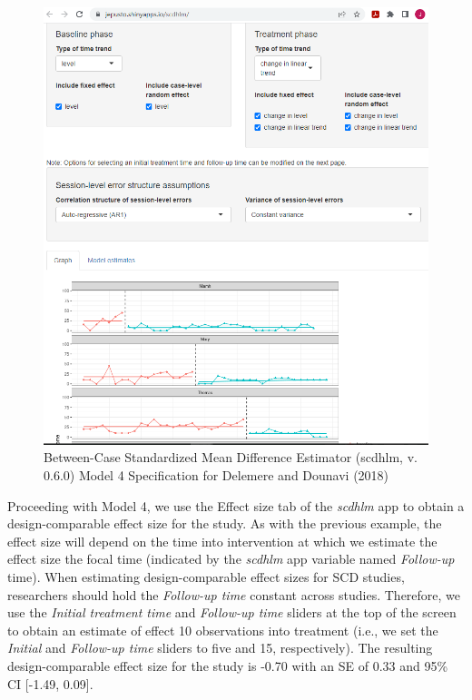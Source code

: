 \documentclass[
]{book}
\begin{document}
\begin{figure}
\includegraphics[width=0.6\linewidth]{images/app.model.model4_DelemereDounavi2018} \caption{Between-Case Standardized Mean Difference Estimator (scdhlm, v. 0.6.0) Model 4 Specification for Delemere and Dounavi (2018)}\label{fig:Delemere-model4}
\end{figure}

Proceeding with Model 4, we use the Effect size tab of the \emph{scdhlm} app to obtain a design-comparable effect size for the \citet{delemere2018ParentImplemented} study. As with the previous example, the effect size will depend on the time into intervention at which we estimate the effect size the focal time (indicated by the \emph{scdhlm} app variable named \emph{Follow-up} time). When estimating design-comparable effect sizes for SCD studies, researchers should hold the \emph{Follow-up time} constant across studies. Therefore, we use the \emph{Initial treatment time} and \emph{Follow-up time} sliders at the top of the screen to obtain an estimate of effect 10 observations into treatment (i.e., we set the \emph{Initial} and \emph{Follow-up time} sliders to five and 15, respectively). The resulting design-comparable effect size for the \citet{delemere2018ParentImplemented} study is -0.70 with an SE of 0.33 and 95\% CI {[}-1.49, 0.09{]}.
\end{document}
